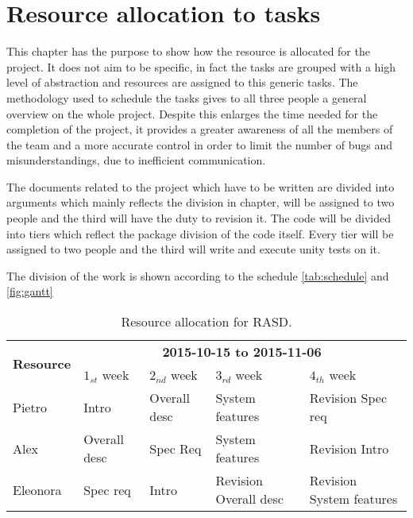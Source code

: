 \chapter{Resource allocation to tasks}
\label{chap:resource-allocation}

This chapter has the purpose to show how the resource is allocated for the project. It does not aim to be specific, in fact the tasks are grouped with a high level of abstraction and resources are assigned to this generic tasks.
The methodology used to schedule the tasks gives to all three people a general overview on the whole project. 
Despite this enlarges the time needed for the completion of the project, it provides a greater awareness of all the members of the team and a more accurate control in order to limit the number of bugs and misunderstandings, due to inefficient communication. 

The documents related to the project which have to be written are divided into arguments which mainly reflects the division in chapter, will be assigned to two people and the third will have the duty to revision it. 
The code will be divided into tiers which reflect the package division of the code itself. Every tier will be assigned to two people and the third will write and execute unity tests on it.

The division of the work is shown  according to the schedule \autoref{tab:schedule} and \autoref{fig:gantt}


\begin{table}[h]
    \centering
    \begin{small}
    \begin{tabular}{| l | l | l | l | l |}
        \hline
        \multirow{2}{*}{\textbf{Resource}} & \multicolumn{4}{c|}{\textbf{2015-10-15 to 2015-11-06}} \\
        \cline{2-5}
        & $1_{st}$ week & $2_{nd}$ week & $3_{rd} $ week & $4_{th}$ week\\
        \hline
        Pietro        & Intro    & Overall desc     & System features & Revision Spec req    \\
        Alex         & Overall desc     & Spec Req     & System features & Revision Intro   \\
        Eleonora        & Spec req     & Intro     & Revision Overall desc &    Revision System features  \\
        \hline
    \end{tabular}
    \end{small}
    \caption{Resource allocation for RASD.}
    \label{tab:rasd-alloc}
\end{table}


